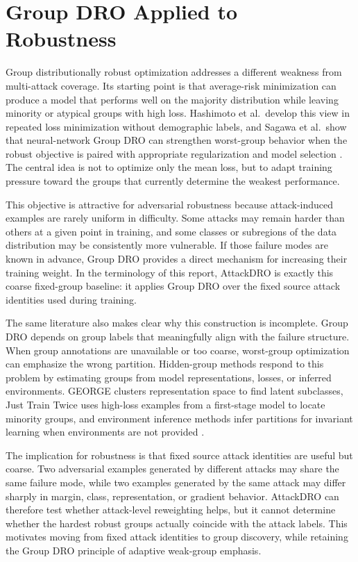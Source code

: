 \section{Group DRO Applied to Robustness}

Group distributionally robust optimization addresses a different weakness from
multi-attack coverage. Its starting point is that average-risk minimization can
produce a model that performs well on the majority distribution while leaving
minority or atypical groups with high loss. Hashimoto et al.\ develop this
view in repeated loss minimization without demographic labels, and Sagawa et
al.\ show that neural-network Group DRO can strengthen worst-group behavior when
the robust objective is paired with appropriate regularization and model
selection \cite{hashimoto2018fairness,sagawa2019groupdro}. The central idea is
not to optimize only the mean loss, but to adapt training pressure toward the
groups that currently determine the weakest performance.

This objective is attractive for adversarial robustness because attack-induced
examples are rarely uniform in difficulty. Some attacks may remain harder than
others at a given point in training, and some classes or subregions of the data
distribution may be consistently more vulnerable. If those failure modes are
known in advance, Group DRO provides a direct mechanism for increasing their
training weight. In the terminology of this report, AttackDRO is exactly this
coarse fixed-group baseline: it applies Group DRO over the fixed source attack
identities used during training.

The same literature also makes clear why this construction is incomplete. Group
DRO depends on group labels that meaningfully align with the failure structure.
When group annotations are unavailable or too coarse, worst-group optimization
can emphasize the wrong partition. Hidden-group methods respond to this problem
by estimating groups from model representations, losses, or inferred
environments. GEORGE clusters representation space to find latent subclasses,
Just Train Twice uses high-loss examples from a first-stage model to locate
minority groups, and environment inference methods infer partitions for
invariant learning when environments are not provided
\cite{sohoni2020no,liu2021just,creager2021environment}.

The implication for robustness is that fixed source attack identities are
useful but coarse. Two adversarial examples generated by different attacks may
share the same failure mode, while two examples generated by the same attack
may differ sharply in margin, class, representation, or gradient behavior.
AttackDRO can therefore test whether attack-level reweighting helps, but it
cannot determine whether the hardest robust groups actually coincide with the
attack labels. This motivates moving from fixed attack identities to group
discovery, while retaining the Group DRO principle of adaptive weak-group
emphasis.
